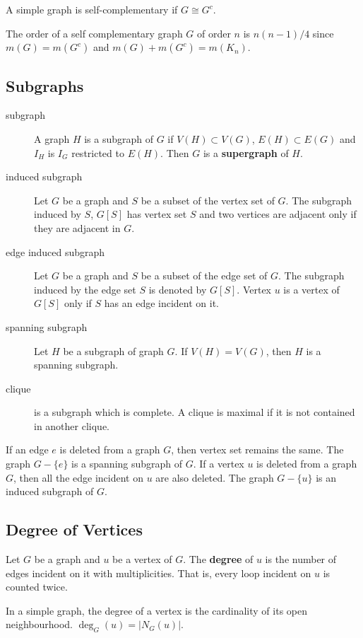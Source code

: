 \begin{definition}
	A simple graph is self-complementary if $G \cong G^c$.
\end{definition}
\begin{remark}
	The order of a self complementary graph $G$ of order $n$ is $n(n-1)/4$ since $m(G) = m(G^c)$ and $m(G) + m(G^c) = m(K_n)$.
\end{remark}

\subsection{Subgraphs}
\begin{description}
	\item[subgraph] A graph $H$ is a subgraph of $G$ if $V(H) \subset V(G)$, $E(H) \subset E(G)$ and $I_H$ is $I_G$ restricted to $E(H)$. Then $G$ is a \textbf{supergraph} of $H$.
	\item[induced subgraph] Let $G$ be a graph and $S$ be a subset of the vertex set of $G$. The subgraph induced by $S$, $G[S]$ has vertex set $S$ and two vertices are adjacent only if they are adjacent in $G$.
	\item[edge induced subgraph] Let $G$ be a graph and $S$ be a subset of the edge set of $G$. The subgraph induced by the edge set $S$ is denoted by $G[S]$. Vertex $u$ is a vertex of $G[S]$ only if $S$ has an edge incident on it.
	\item[spanning subgraph] Let $H$ be a subgraph of graph $G$. If $V(H) = V(G)$, then $H$ is a spanning subgraph.
	\item[clique] is a subgraph which is complete. A clique is maximal if it is not contained in another clique.
\end{description}

\begin{remark}
	If an edge $e$ is deleted from a graph $G$, then vertex set remains the same. The graph $G-\{e\}$ is a spanning subgraph of $G$.
	If a vertex $u$ is deleted from a graph $G$, then all the edge incident on $u$ are also deleted. The graph $G-\{u\}$ is an induced subgraph of $G$.
\end{remark}

\subsection{Degree of Vertices}
\begin{definition}
	Let $G$ be a graph and $u$ be a vertex of $G$.
	The \textbf{degree} of $u$ is the number of edges incident on it with multiplicities. That is, every loop incident on $u$ is counted twice.
\end{definition}
\begin{remark}
	In a simple graph, the degree of a vertex is the cardinality of its open neighbourhood.
	$\deg_G(u) = |N_G(u)|$.
\end{remark}

